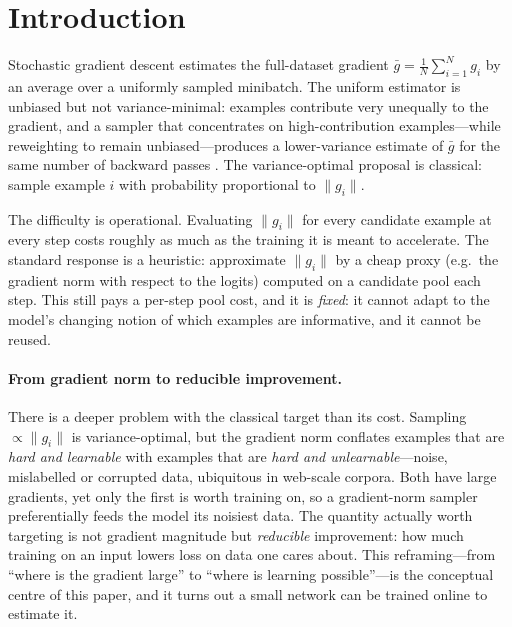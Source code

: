 \documentclass[11pt]{article}
\begin{document}
\section{Introduction}

Stochastic gradient descent estimates the full-dataset gradient
$\bar g = \tfrac1N \sum_{i=1}^N g_i$ by an average over a uniformly sampled
minibatch. The uniform estimator is unbiased but not variance-minimal: examples
contribute very unequally to the gradient, and a sampler that concentrates on
high-contribution examples---while reweighting to remain unbiased---produces a
lower-variance estimate of $\bar g$ for the same number of backward passes
\citep{alain2015,katharopoulos2018}. The variance-optimal proposal is classical:
sample example $i$ with probability proportional to $\|g_i\|$.

The difficulty is operational. Evaluating $\|g_i\|$ for every candidate example
at every step costs roughly as much as the training it is meant to accelerate.
The standard response is a heuristic: approximate $\|g_i\|$ by a cheap proxy
(e.g.\ the gradient norm with respect to the logits) computed on a candidate
pool each step. This still pays a per-step pool cost, and it is \emph{fixed}: it
cannot adapt to the model's changing notion of which examples are informative,
and it cannot be reused.

\paragraph{From gradient norm to reducible improvement.} There is a deeper
problem with the classical target than its cost. Sampling $\propto\|g_i\|$ is
variance-optimal, but the gradient norm conflates examples that are \emph{hard and
learnable} with examples that are \emph{hard and unlearnable}---noise, mislabelled
or corrupted data, ubiquitous in web-scale corpora. Both have large gradients, yet
only the first is worth training on, so a gradient-norm sampler preferentially
feeds the model its noisiest data. The quantity actually worth targeting is not
gradient magnitude but \emph{reducible} improvement: how much training on an input
lowers loss on data one cares about. This reframing---from ``where is the gradient
large'' to ``where is learning possible''---is the conceptual centre of this paper,
and it turns out a small network can be trained online to estimate it.
\end{document}
